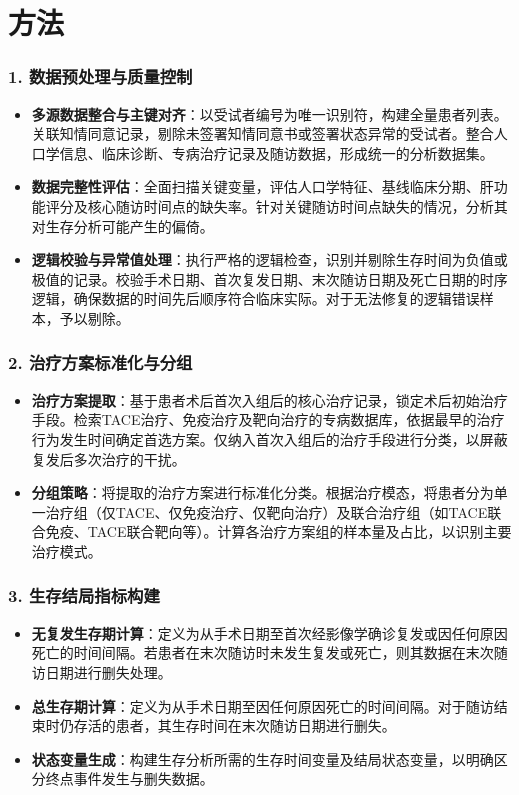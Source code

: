 \documentclass{article}
\begin{document}
\section{方法}
\subsubsection{1. 数据预处理与质量控制}
\begin{itemize}
\item \textbf{多源数据整合与主键对齐}：以受试者编号为唯一识别符，构建全量患者列表。关联知情同意记录，剔除未签署知情同意书或签署状态异常的受试者。整合人口学信息、临床诊断、专病治疗记录及随访数据，形成统一的分析数据集。
\item \textbf{数据完整性评估}：全面扫描关键变量，评估人口学特征、基线临床分期、肝功能评分及核心随访时间点的缺失率。针对关键随访时间点缺失的情况，分析其对生存分析可能产生的偏倚。
\item \textbf{逻辑校验与异常值处理}：执行严格的逻辑检查，识别并剔除生存时间为负值或极值的记录。校验手术日期、首次复发日期、末次随访日期及死亡日期的时序逻辑，确保数据的时间先后顺序符合临床实际。对于无法修复的逻辑错误样本，予以剔除。
\end{itemize}

\subsubsection{2. 治疗方案标准化与分组}
\begin{itemize}
\item \textbf{治疗方案提取}：基于患者术后首次入组后的核心治疗记录，锁定术后初始治疗手段。检索TACE治疗、免疫治疗及靶向治疗的专病数据库，依据最早的治疗行为发生时间确定首选方案。仅纳入首次入组后的治疗手段进行分类，以屏蔽复发后多次治疗的干扰。
\item \textbf{分组策略}：将提取的治疗方案进行标准化分类。根据治疗模态，将患者分为单一治疗组（仅TACE、仅免疫治疗、仅靶向治疗）及联合治疗组（如TACE联合免疫、TACE联合靶向等）。计算各治疗方案组的样本量及占比，以识别主要治疗模式。
\end{itemize}

\subsubsection{3. 生存结局指标构建}
\begin{itemize}
\item \textbf{无复发生存期计算}：定义为从手术日期至首次经影像学确诊复发或因任何原因死亡的时间间隔。若患者在末次随访时未发生复发或死亡，则其数据在末次随访日期进行删失处理。
\item \textbf{总生存期计算}：定义为从手术日期至因任何原因死亡的时间间隔。对于随访结束时仍存活的患者，其生存时间在末次随访日期进行删失。
\item \textbf{状态变量生成}：构建生存分析所需的生存时间变量及结局状态变量，以明确区分终点事件发生与删失数据。
\end{itemize}
\end{document}
